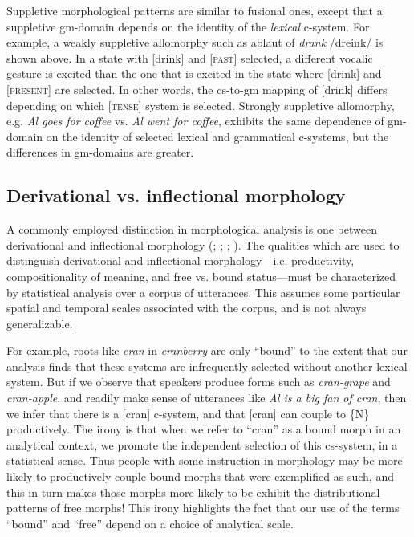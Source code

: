   Suppletive morphological patterns are similar to fusional ones, except that a suppletive gm-domain depends on the identity of the \textit{lexical} c-system. For example, a weakly suppletive allomorphy such as ablaut of \textit{drank} /dreink/ is shown above. In a state with [drink] and [\textsc{past}] selected, a different vocalic gesture is excited than the one that is excited in the state where [drink] and [\textsc{present}] are selected. In other words, the cs-to-gm mapping of [drink] differs depending on which [\textsc{tense}] system is selected. Strongly suppletive allomorphy, e.g. \textit{Al goes for coffee} vs. \textit{Al went for coffee}, exhibits the same dependence of gm-domain on the identity of selected lexical and grammatical c-systems, but the differences in gm-domains are greater.

\subsection{Derivational vs. inflectional morphology}

A commonly employed distinction in morphological analysis is one between derivational and inflectional morphology (\citealt{BickelNichols2007}; \citealt{Booij1996}; \citealt{Dressler1989}; \citealt{HaspelmathSims2013}). The qualities which are used to distinguish derivational and inflectional morphology—i.e. productivity, compositionality of meaning, and free vs. bound status—must be characterized by statistical analysis over a corpus of utterances. This assumes some particular spatial and temporal scales associated with the corpus, and is not always generalizable. 

  For example, roots like \textit{cran} in \textit{cranberry} are only “bound” to the extent that our analysis finds that these systems are infrequently selected without another lexical system. But if we observe that speakers produce forms such as \textit{cran-grape} and \textit{cran-apple}, and readily make sense of utterances like \textit{Al is a big fan of cran}, then we infer that there is a [cran] c-system, and that [cran] can couple to \{N\} productively. The irony is that when we refer to “cran” as a bound morph in an analytical context, we promote the independent selection of this cs-system, in a statistical sense. Thus people with some instruction in morphology may be more likely to productively couple bound morphs that were exemplified as such, and this in turn makes those morphs more likely to be exhibit the distributional patterns of free morphs! This irony highlights the fact that our use of the terms “bound” and “free” depend on a choice of analytical scale.

